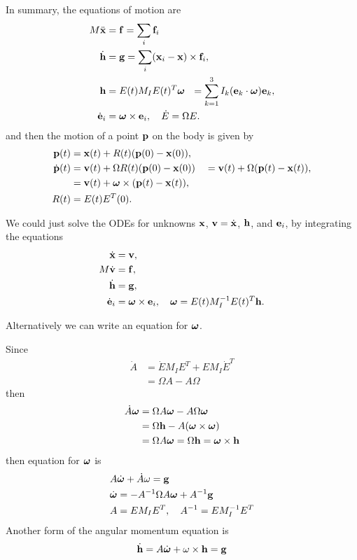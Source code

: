 In summary, the equations of motion are
\begin{align*}
  M \ddot {\mathbf{ x}} &= \mathbf{ f} = \sum_i \mathbf{ f}_i \\
  \dot{\mathbf{ h}} &= \mathbf{ g} = \sum_i (\mathbf{ x}_i-\mathbf{ x})\times\mathbf{ f}_i , \\
  \mathbf{ h} &= E(t) M_I E(t)^T\boldsymbol{\omega}~~ = \sum_{k=1}^3  I_k (\mathbf{ e}_k\cdot\boldsymbol{\omega}) \mathbf{ e}_k, \\
  \dot{\mathbf{ e}}_i &= \boldsymbol{\omega}\times\mathbf{ e}_i , \quad \dot E = \Omega E.
\end{align*}
and then the motion of a point $\mathbf{ p}$ on the body is given by
\begin{align*}
  \mathbf{ p}(t) &= \mathbf{ x}(t) + R(t) (\mathbf{ p}(0)-\mathbf{ x}(0)) , \\
 \dot{\mathbf{ p}}(t) &= \mathbf{ v}(t) + \Omega R(t) (\mathbf{ p}(0)-\mathbf{ x}(0)) \quad = \mathbf{ v}(t) + \Omega (\mathbf{ p}(t)-\mathbf{ x}(t)), \\
            &= \mathbf{ v}(t) + \boldsymbol{\omega}\times (\mathbf{ p}(t)-\mathbf{ x}(t)),\\
 R(t)& = E(t)E^T(0).
\end{align*}

We could just solve the ODEs for unknowns $\mathbf{ x}$, $\mathbf{ v}=\dot{\mathbf{ x}}$, $\mathbf{ h}$, and $\mathbf{ e}_i$, by
integrating the equations
\begin{align*}
  \dot {\mathbf{ x}} &= \mathbf{ v} , \\
  M \dot {\mathbf{ v}} &= \mathbf{ f} , \\
  \dot{\mathbf{ h}} &= \mathbf{ g} , \\
  \dot{\mathbf{ e}}_i &= \boldsymbol{\omega}\times\mathbf{ e}_i ,\quad   \boldsymbol{\omega} = E(t) M_I^{-1} E(t)^T\mathbf{ h} .
\end{align*}

Alternatively we can write an equation for $\boldsymbol{\omega}$.

Since
\begin{align*}
   \dot A  &= \dot E M_I E^T + E M_I \dot E^T \\
                  &= \Omega A - A \Omega
\end{align*}
then
\begin{align*}
  \dot A\boldsymbol{\omega}  &= \Omega A\boldsymbol{\omega} - A\Omega\boldsymbol{\omega} \\
         &= \Omega \mathbf{ h} - A (\boldsymbol{\omega}\times\boldsymbol{\omega})\\
         &= \Omega A\boldsymbol{\omega} = \Omega \mathbf{ h} = \boldsymbol{\omega}\times\mathbf{ h}
\end{align*}
then equation for $\boldsymbol{\omega}$ is
\begin{align*}
 &  A \dot{\boldsymbol{\omega}} + \dot A \omega = \mathbf{ g} \\
 &  \dot{\boldsymbol{\omega}} = - A^{-1}\Omega A \boldsymbol{\omega} + A^{-1}\mathbf{ g} \\
 &  A = E M_I E^T, \quad A^{-1} = E M_I^{-1} E^T
 \end{align*}
Another form of the angular momentum equation is 
\begin{align*}
   \dot {\mathbf{ h}} = A \dot{\boldsymbol{\omega}} + \omega\times\mathbf{ h} = \mathbf{ g} 
\end{align*}


